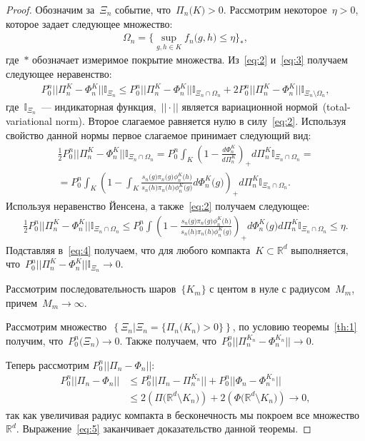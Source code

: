 \documentclass[12pt, twoside]{article}
\numberwithin{equation}{section}
\begin{document}
\begin{proof}
Обозначим за~$\Xi_n$ событие, что~$\Pi_n\bigr(K\bigr)>0$.  Рассмотрим некоторое~$\eta > 0$, которое задает следующее множество:
\[
\label{eq:3}
\begin{aligned}
\Omega_n = \{\sup_{g,h\in K}f_n\bigr(g,h\bigr) \leq \eta\}_*,
\end{aligned}
\]
где~$*$ обозначает измеримое покрытие множества. Из~\eqref{eq:2} и~\eqref{eq:3} получаем следующее неравенство:
\[
\label{eq:4}
\begin{aligned}
P_0^n||\Pi_n^K - \Phi_n^K||\mathbb{I}_{\Xi_n} \leq P_0^n||\Pi_n^K - \Phi_n^K||\mathbb{I}_{\Xi_n\cap \Omega_n} + 2P_0^n||\Pi_n^K - \Phi_n^K||\mathbb{I}_{\Xi_n \setminus \Omega_n},
\end{aligned}
\]
где~$\mathbb{I}_{\Xi_n}$~--- индикаторная функция,~$||\cdot||$ является вариационной нормой~(total-variational norm). Второе слагаемое равняется нулю в силу~\eqref{eq:2}. Используя свойство данной нормы первое слагаемое принимает следующий вид:
\[
\begin{aligned}
\frac{1}{2}P_0^n||\Pi_n^K - \Phi_n^K||\mathbb{I}_{\Xi_n\cap \Omega_n}  = P_0^n\int_K\left(1-\frac{d\Phi_n^K}{d\Pi_n^K}\right)_+d\Pi_n^K\mathbb{I}_{\Xi_n\cap \Omega_n} = \\
=P_0^n\int_K\left(1-\int_K\frac{s_n\bigr(g\bigr)\pi_n\bigr(g\bigr)\phi^K_n\bigr(h\bigr)}{s_n\bigr(h\bigr)\pi_n\bigr(h\bigr)\phi^K_n\bigr(g\bigr)}d\Phi_n^K\bigr(g\bigr)\right)_+d\Pi_n^K\mathbb{I}_{\Xi_n\cap \Omega_n}.
\end{aligned}
\]
Используя неравенство Йенсена, а также~\eqref{eq:2} получаем следующее:
\[
\begin{aligned}
\frac{1}{2}P_0^n||\Pi_n^K - \Phi_n^K||\mathbb{I}_{\Xi_n\cap \Omega_n}  \leq P_0^n\int\left(1-\frac{s_n\bigr(g\bigr)\pi_n\bigr(g\bigr)\phi^K_n\bigr(h\bigr)}{s_n\bigr(h\bigr)\pi_n\bigr(h\bigr)\phi^K_n\bigr(g\bigr)}\right)_+d\Phi_n^K\bigr(g\bigr)d\Pi_n^K\mathbb{I}_{\Xi_n\cap \Omega_n} \leq \eta.
\end{aligned}
\]
Подставляя в~\eqref{eq:4} получаем, что для любого компакта~$K\subset \mathbb{R}^d$ выполняется, что~$P_0^n||\Pi_n^K - \Phi_n^K||\mathbb{I}_{\Xi_n} \to 0$.

Рассмотрим последовательность шаров~$\{K_m\}$ с центом в нуле с радиусом~$M_m$, причем~$M_m \to \infty$.

Рассмотрим множество~$\left\{\Xi_n| \Xi_n = \{\Pi_n\bigr(K_n\bigr)>0\}\right\}$, по условию теоремы~\eqref{th:1} получим, что~$P^n_0\bigr(\Xi_n\bigr) \to 0$. Также получаем, что~$P_0^n||\Pi_n^{K_n} - \Phi_n^{K_n}||\to 0$.

Теперь рассмотрим $P_0^n||\Pi_n - \Phi_n||$:
\[
\label{eq:5}
\begin{aligned}
P_0^n||\Pi_n - \Phi_n|| &\leq P_0^n||\Pi_n - \Pi_n^{K_n}|| + P_0^n||\Phi_n - \Phi_n^{K_n}|| \\
&\leq 2\left(\Pi\bigr(\mathbb{R}^{d}\setminus K_n\bigr)\right) + 2\left(\Phi\bigr(\mathbb{R}^{d}\setminus K_n\bigr)\right) \to 0,
\end{aligned}
\]
так как увеличивая радиус компакта в бесконечность мы покроем все множество~$\mathbb{R}^d$. Выражение~\eqref{eq:5} заканчивает доказательство данной теоремы.
\end{proof}
\end{document}
